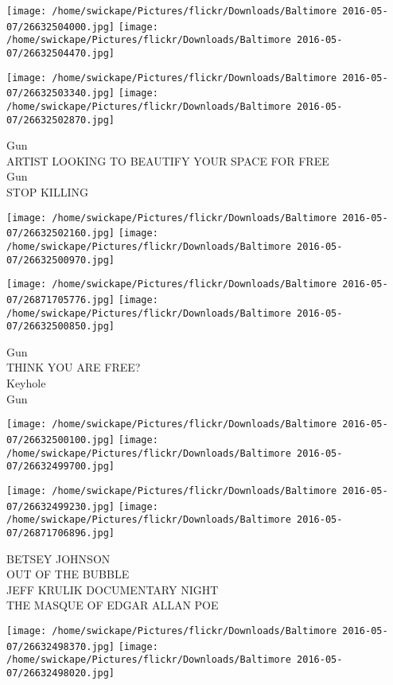 \documentclass[10pt,letterpaper]{article}
\begin{document}
\texttt{[image: /home/swickape/Pictures/flickr/Downloads/Baltimore 2016-05-07/26632504000.jpg]}
\texttt{[image: /home/swickape/Pictures/flickr/Downloads/Baltimore 2016-05-07/26632504470.jpg]}

\texttt{[image: /home/swickape/Pictures/flickr/Downloads/Baltimore 2016-05-07/26632503340.jpg]}
\texttt{[image: /home/swickape/Pictures/flickr/Downloads/Baltimore 2016-05-07/26632502870.jpg]}

Gun\\
ARTIST LOOKING TO BEAUTIFY YOUR SPACE FOR FREE\\
Gun\\
STOP KILLING\\
\pagebreak

\texttt{[image: /home/swickape/Pictures/flickr/Downloads/Baltimore 2016-05-07/26632502160.jpg]}
\texttt{[image: /home/swickape/Pictures/flickr/Downloads/Baltimore 2016-05-07/26632500970.jpg]}

\texttt{[image: /home/swickape/Pictures/flickr/Downloads/Baltimore 2016-05-07/26871705776.jpg]}
\texttt{[image: /home/swickape/Pictures/flickr/Downloads/Baltimore 2016-05-07/26632500850.jpg]}

Gun\\
THINK YOU ARE FREE?\\
Keyhole\\
Gun\\
\pagebreak

\texttt{[image: /home/swickape/Pictures/flickr/Downloads/Baltimore 2016-05-07/26632500100.jpg]}
\texttt{[image: /home/swickape/Pictures/flickr/Downloads/Baltimore 2016-05-07/26632499700.jpg]}

\texttt{[image: /home/swickape/Pictures/flickr/Downloads/Baltimore 2016-05-07/26632499230.jpg]}
\texttt{[image: /home/swickape/Pictures/flickr/Downloads/Baltimore 2016-05-07/26871706896.jpg]}

BETSEY JOHNSON\\
OUT OF THE BUBBLE\\
JEFF KRULIK DOCUMENTARY NIGHT\\
THE MASQUE OF EDGAR ALLAN POE\\
\pagebreak

\texttt{[image: /home/swickape/Pictures/flickr/Downloads/Baltimore 2016-05-07/26632498370.jpg]}
\texttt{[image: /home/swickape/Pictures/flickr/Downloads/Baltimore 2016-05-07/26632498020.jpg]}
\end{document}
